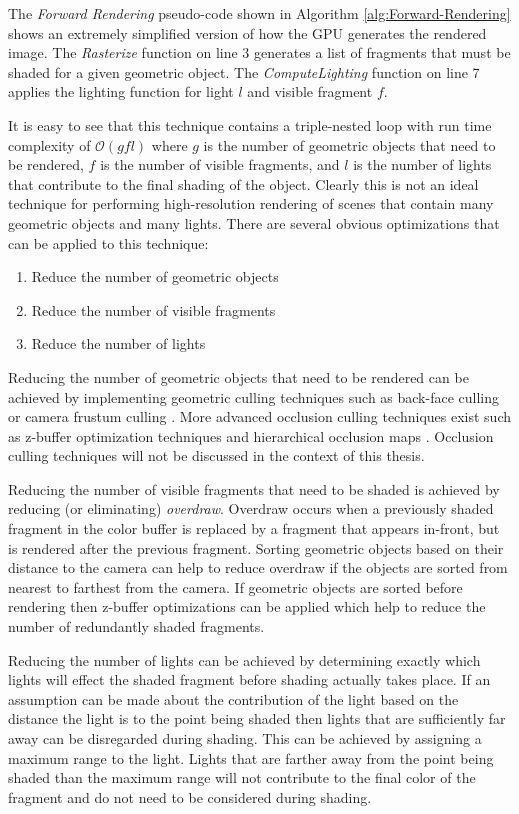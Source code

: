 The \emph{Forward Rendering} pseudo-code shown in Algorithm \ref{alg:Forward-Rendering} shows an extremely simplified version of how the GPU generates the rendered image. The \emph{Rasterize} function on line 3 generates a list of fragments that must be shaded for a given geometric object. The \emph{ComputeLighting} function on line 7 applies the lighting function for light $l$ and visible fragment $f$.

It is easy to see that this technique contains a triple-nested loop with run time complexity of $\mathcal{O}(gfl)$ where $g$ is the number of geometric objects that need to be rendered, $f$ is the number of visible fragments, and $l$ is the number of lights that contribute to the final shading of the object. Clearly this is not an ideal technique for performing high-resolution rendering of scenes that contain many geometric objects and many lights. There are several obvious optimizations that can be applied to this technique:

\begin{enumerate}
\item{Reduce the number of geometric objects}
\item{Reduce the number of visible fragments}
\item{Reduce the number of lights}
\end{enumerate}

Reducing the number of geometric objects that need to be rendered can be achieved by implementing geometric culling techniques such as back-face culling or camera frustum culling \parencite{40_clark_1976}. More advanced occlusion culling techniques exist such as z-buffer optimization techniques \parencite{41_catmull_1974} and hierarchical occlusion maps \parencite{39_zhang_manocha_hudson_hoff_1997}. Occlusion culling techniques will not be discussed in the context of this thesis.

Reducing the number of visible fragments that need to be shaded is achieved by reducing (or eliminating) \emph{overdraw}. Overdraw occurs when a previously shaded fragment in the color buffer is replaced by a fragment that appears in-front, but is rendered after the previous fragment.  Sorting geometric objects based on their distance to the camera can help to reduce overdraw if the objects are sorted from nearest to farthest from the camera. If geometric objects are sorted before rendering then z-buffer optimizations can be applied which help to reduce the number of redundantly shaded fragments.

Reducing the number of lights can be achieved by determining exactly which lights will effect the shaded fragment before shading actually takes place. If an assumption can be made about the contribution of the light based on the distance the light is to the point being shaded then lights that are sufficiently far away can be disregarded during shading. This can be achieved by assigning a maximum range to the light. Lights that are farther away from the point being shaded than the maximum range will not contribute to the final color of the fragment and do not need to be considered during shading.

